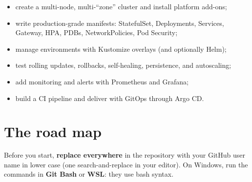 \label{ch:capstone-devops}

\begin{objectives}
\begin{itemize}
  \item create a multi-node, multi-``zone'' cluster and install platform add-ons;
  \item write production-grade manifests: StatefulSet, Deployments, Services,
        Gateway, HPA, PDBs, NetworkPolicies, Pod Security;
  \item manage environments with Kustomize overlays (and optionally Helm);
  \item test rolling updates, rollbacks, self-healing, persistence, and autoscaling;
  \item add monitoring and alerts with Prometheus and Grafana;
  \item build a CI pipeline and deliver with GitOps through Argo CD.
\end{itemize}
\end{objectives}

\section{The road map}

\begin{center}
\end{center}

\begin{warningbox}
Before you start, \textbf{replace  everywhere} in the
repository with your GitHub user name in lower case (one search-and-replace in
your editor). On Windows, run the commands in \textbf{Git Bash} or \textbf{WSL}:
they use bash syntax.
\end{warningbox}

